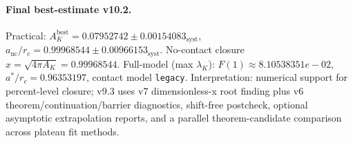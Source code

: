 \paragraph{Final best-estimate v10.2.}
Practical: $A_K^{\mathrm{best}} = 0.07952742 \pm 0.00154083_{\mathrm{syst}}$, $a_{\mathrm{nc}}/r_c = 0.99968544 \pm 0.00966153_{\mathrm{syst}}$.
No-contact closure $x = \sqrt{4\pi A_K} = 0.99968544$.
Full-model (max $\lambda_K$): $F(1) \approx 8.10538351e-02$, $a^*/r_c = 0.96353197$, contact model \texttt{legacy}.
Interpretation: numerical support for percent-level closure; v9.3 uses v7 dimensionless-x root finding plus v6 theorem/continuation/barrier diagnostics, shift-free postcheck, optional asymptotic extrapolation reports, and a parallel theorem-candidate comparison across plateau fit methods.

